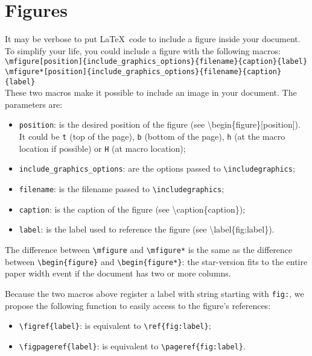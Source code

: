 \documentclass[book]{upmethodology-document}
\begin{document}
\section{Figures}

It may be verbose to put \LaTeX\ code to include a figure inside your document. To simplify your life, you could include a figure with the following macros: \\
\texttt{{\textbackslash}mfigure[position]\{include\_graphics\_options\}\{filename\}\{caption\}\{label\}} \\
\texttt{{\textbackslash}mfigure*[position]\{include\_graphics\_options\}\{filename\}\{caption\}\{label\}} \\

These two macros make it possible to include an image in your document. The parameters are:
\begin{itemize}
\item \texttt{position}: is the desired position of the figure (see {\textbackslash}begin\{figure\}[position]). It could be \texttt{t} (top of the page), \texttt{b} (bottom of the page), \texttt{h} (at the macro location if possible) or \texttt{H} (at macro location);

\item \texttt{include\_graphics\_options}: are the options passed to \texttt{{\textbackslash}includegraphics};

\item \texttt{filename}: is the filename passed to \texttt{{\textbackslash}includegraphics};

\item \texttt{caption}: is the caption of the figure (see {\textbackslash}caption\{caption\});

\item \texttt{label}: is the label used to reference the figure (see {\textbackslash}label\{fig:label\}).
\end{itemize}

The difference between \texttt{{\textbackslash}mfigure} and \texttt{{\textbackslash}mfigure*} is the same as the difference between \texttt{{\textbackslash}begin\{figure\}} and \texttt{{\textbackslash}begin\{figure*\}}: the star-version fits to the entire paper width event if the document has two or more columns.

Because the two macros above register a label with string starting with \texttt{fig:}, we propose the following function to easily access to the figure's references:
\begin{itemize}
\item \texttt{{\textbackslash}figref\{label\}}: is equivalent to \texttt{{\textbackslash}ref\{fig:label\}};
\item \texttt{{\textbackslash}figpageref\{label\}}: is equivalent to \texttt{{\textbackslash}pageref\{fig:label\}}.
\end{itemize}
\end{document}
